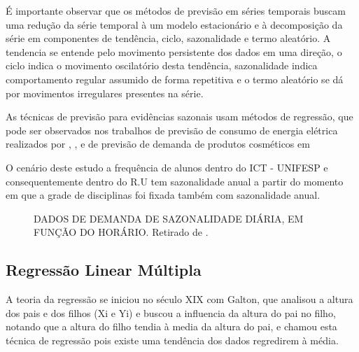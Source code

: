 \documentclass[	12pt, Times, openright, twoside, a4paper, english, brazil]{abntex2}
\begin{document}
É importante observar que os métodos de previsão em séries temporais buscam uma redução da série temporal à um modelo estacionário e à decomposição da série em componentes de tendência, ciclo, sazonalidade e termo aleatório. A tendencia se entende pelo movimento persistente dos dados em uma direção, o ciclo indica o movimento oscilatório desta tendência, sazonalidade indica comportamento regular assumido de forma repetitiva e o termo aleatório se dá por movimentos irregulares presentes na série.
 
As técnicas de previsão para evidências sazonais usam métodos de regressão, que pode ser observados nos trabalhos de previsão de consumo de energia elétrica realizados por \cite{Almeida2013}, \cite{Ruas2012}, \cite{Silva2010} e de previsão de demanda de produtos cosméticos em \cite{Junior2007}

O cenário deste estudo a frequência de alunos dentro do ICT - UNIFESP e consequentemente dentro do R.U tem sazonalidade anual a partir do momento em que a grade de disciplinas foi fixada também com sazonalidade anual. 

\begin{figure}[!ht]
	\caption{DADOS DE DEMANDA DE SAZONALIDADE DIÁRIA, EM FUNÇÃO DO HORÁRIO. Retirado de \cite{RUAS2012}.\label{fig:seriesTemporais}}
\end{figure}

\subsection{Regressão Linear Múltipla}
A teoria da regressão se iniciou no século XIX com Galton, que analisou a altura dos pais e dos filhos (Xi e Yi) e buscou a influencia da altura do pai no filho, notando que a altura do filho tendia à media da altura do pai, e chamou esta técnica de regressão pois existe uma tendência dos dados regredirem à média.
\end{document}
